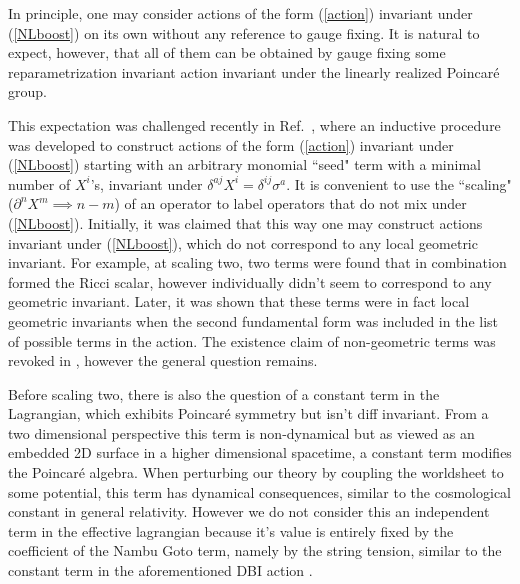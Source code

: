 \documentclass[%
 reprint,
 amsmath,amssymb,
 aps,
]{revtex4-1}
\newcommand{\pd}{\partial}
\begin{document}
In principle, one may consider actions of the form (\ref{action}) invariant under (\ref{NLboost}) on its own  without any reference to  gauge fixing.
It is natural to expect, however, that all of them can be obtained by gauge fixing some reparametrization invariant action
invariant under the linearly realized Poincar\'e group.

This expectation was challenged recently in Ref.~\cite{Gliozzi:2012cx}, where an inductive procedure was developed
to construct actions of the form (\ref{action}) invariant under (\ref{NLboost}) starting with an arbitrary monomial ``seed" term with a minimal number of $X^i$'s, invariant under
$\delta^{aj}X^i= \delta^{ij}  \sigma^a $. It is convenient to use the ``scaling" ($\pd^n X^m \implies n-m$)
of an operator to label operators that do not mix under (\ref{NLboost}).
Initially, it was claimed that this way one may construct actions invariant under (\ref{NLboost}), which do not correspond
to any local geometric invariant. For example, at scaling two, two terms were found that in combination formed the Ricci scalar, however individually didn't
seem to correspond to any geometric invariant. Later, it was shown that these terms were in fact local geometric invariants when the second fundamental form was included in the list
of possible terms in the action. The existence claim of non-geometric terms was revoked in \cite{Meineri:2013ew}, however the general question remains.

Before scaling two, there is also the question of a constant term in the Lagrangian, which exhibits Poincar\'e symmetry but isn't diff invariant.  From a two dimensional perspective
this term is non-dynamical but as viewed as an embedded 2D surface in a higher dimensional spacetime, a constant term modifies the Poincar\'e algebra.  When perturbing our theory
by coupling the worldsheet to some potential, this term has dynamical consequences, similar to the cosmological constant in general relativity.  However we do not consider this
an independent term in the effective lagrangian because it's value is entirely fixed by the coefficient of the Nambu Goto term, namely by the string tension, similar
to the constant term in the aforementioned DBI action \cite{deRham:2010eu}.
\end{document}
